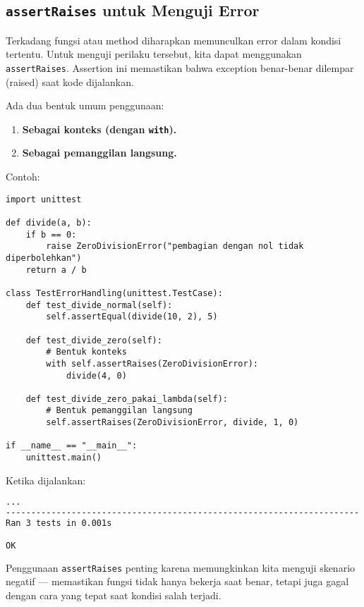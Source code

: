 \subsection{\texttt{assertRaises} untuk Menguji Error}

Terkadang fungsi atau method diharapkan memunculkan error dalam kondisi tertentu.  
Untuk menguji perilaku tersebut, kita dapat menggunakan \texttt{assertRaises}.  
Assertion ini memastikan bahwa exception benar-benar dilempar (raised) saat kode dijalankan.

Ada dua bentuk umum penggunaan:
\begin{enumerate}
    \item \textbf{Sebagai konteks (dengan \texttt{with}).}
    \item \textbf{Sebagai pemanggilan langsung.}
\end{enumerate}

Contoh:

\begin{lstlisting}[style=PythonStyle, caption={Contoh penggunaan assertRaises}, label={lst:assertraises}]
import unittest

def divide(a, b):
    if b == 0:
        raise ZeroDivisionError("pembagian dengan nol tidak diperbolehkan")
    return a / b

class TestErrorHandling(unittest.TestCase):
    def test_divide_normal(self):
        self.assertEqual(divide(10, 2), 5)

    def test_divide_zero(self):
        # Bentuk konteks
        with self.assertRaises(ZeroDivisionError):
            divide(4, 0)

    def test_divide_zero_pakai_lambda(self):
        # Bentuk pemanggilan langsung
        self.assertRaises(ZeroDivisionError, divide, 1, 0)

if __name__ == "__main__":
    unittest.main()
\end{lstlisting}

Ketika dijalankan:

\begin{lstlisting}[language=bash]
...
----------------------------------------------------------------------
Ran 3 tests in 0.001s

OK
\end{lstlisting}

Penggunaan \texttt{assertRaises} penting karena memungkinkan kita menguji skenario negatif — memastikan fungsi tidak hanya bekerja saat benar, tetapi juga gagal dengan cara yang tepat saat kondisi salah terjadi.

